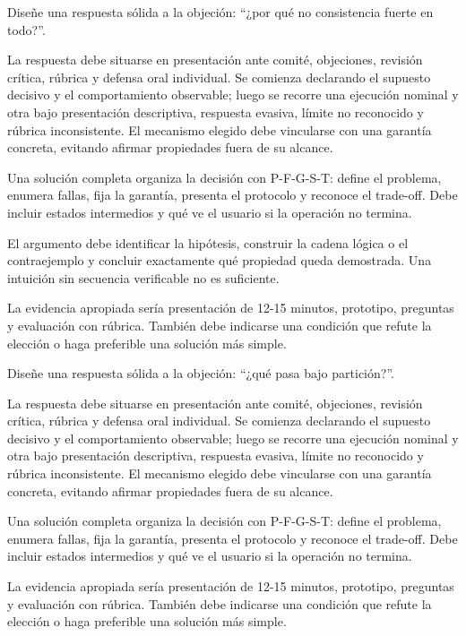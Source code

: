 \documentclass[variant=guia,cover=institutional,mode=screen]{ua-engineering-v6-article}
\begin{document}
\begin{uaexercise}
Diseñe una respuesta sólida a la objeción: “¿por qué no consistencia fuerte en todo?”.
\end{uaexercise}
\begin{uaanswer}
La respuesta debe situarse en presentación ante comité, objeciones, revisión crítica, rúbrica y defensa oral individual. Se comienza declarando el supuesto decisivo y el comportamiento observable; luego se recorre una ejecución nominal y otra bajo presentación descriptiva, respuesta evasiva, límite no reconocido y rúbrica inconsistente. El mecanismo elegido debe vincularse con una garantía concreta, evitando afirmar propiedades fuera de su alcance.

Una solución completa organiza la decisión con P-F-G-S-T: define el problema, enumera fallas, fija la garantía, presenta el protocolo y reconoce el trade-off. Debe incluir estados intermedios y qué ve el usuario si la operación no termina.

El argumento debe identificar la hipótesis, construir la cadena lógica o el contraejemplo y concluir exactamente qué propiedad queda demostrada. Una intuición sin secuencia verificable no es suficiente.

La evidencia apropiada sería presentación de 12-15 minutos, prototipo, preguntas y evaluación con rúbrica. También debe indicarse una condición que refute la elección o haga preferible una solución más simple.
\end{uaanswer}

\begin{uaexercise}
Diseñe una respuesta sólida a la objeción: “¿qué pasa bajo partición?”.
\end{uaexercise}
\begin{uaanswer}
La respuesta debe situarse en presentación ante comité, objeciones, revisión crítica, rúbrica y defensa oral individual. Se comienza declarando el supuesto decisivo y el comportamiento observable; luego se recorre una ejecución nominal y otra bajo presentación descriptiva, respuesta evasiva, límite no reconocido y rúbrica inconsistente. El mecanismo elegido debe vincularse con una garantía concreta, evitando afirmar propiedades fuera de su alcance.

Una solución completa organiza la decisión con P-F-G-S-T: define el problema, enumera fallas, fija la garantía, presenta el protocolo y reconoce el trade-off. Debe incluir estados intermedios y qué ve el usuario si la operación no termina.

La evidencia apropiada sería presentación de 12-15 minutos, prototipo, preguntas y evaluación con rúbrica. También debe indicarse una condición que refute la elección o haga preferible una solución más simple.
\end{uaanswer}
\end{document}

